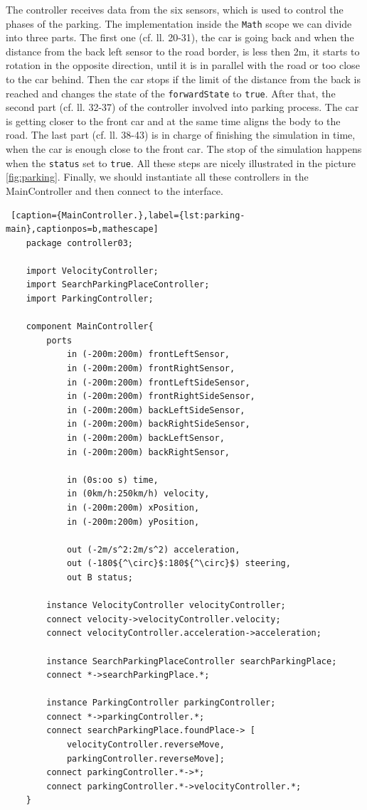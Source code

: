 \bigskip
The controller receives data from the six sensors, which is used to control the phases of the parking. The implementation inside the \texttt{Math} scope we can divide into three parts. The first one (cf. ll. 20-31), the car is going back and when the distance from the back left sensor to the road border, is less then 2m, it starts  to rotation in the opposite direction, until it is in parallel with the road or too close to the car behind. Then the car stops if the limit of the distance from the back is reached and changes the state of the \texttt{forwardState} to \texttt{true}. After that, the second part (cf. ll. 32-37) of the controller involved into parking process. The car is getting closer to the front car and at the same time aligns the body to the road. The last part (cf. ll. 38-43) is in charge of finishing the simulation in time, when the car is enough close to the front car. The stop of the simulation happens when the \texttt{status} set to \texttt{true}. All these steps are nicely illustrated in the picture \ref{fig:parking}. 
Finally, we should instantiate all these controllers in the MainController and then connect to the interface.
\bigskip
\begin{lstlisting} [caption={MainController.},label={lst:parking-main},captionpos=b,mathescape]
    package controller03;

    import VelocityController;
    import SearchParkingPlaceController;
    import ParkingController;
    
    component MainController{
        ports 
            in (-200m:200m) frontLeftSensor,
            in (-200m:200m) frontRightSensor,
            in (-200m:200m) frontLeftSideSensor,
            in (-200m:200m) frontRightSideSensor,
            in (-200m:200m) backLeftSideSensor,
            in (-200m:200m) backRightSideSensor,
            in (-200m:200m) backLeftSensor,
            in (-200m:200m) backRightSensor,
    
            in (0s:oo s) time,
            in (0km/h:250km/h) velocity,
            in (-200m:200m) xPosition,
            in (-200m:200m) yPosition,
    
            out (-2m/s^2:2m/s^2) acceleration,
            out (-180${^\circ}$:180${^\circ}$) steering,
            out B status;
    
        instance VelocityController velocityController;
        connect velocity->velocityController.velocity;
        connect velocityController.acceleration->acceleration;
    
        instance SearchParkingPlaceController searchParkingPlace;
        connect *->searchParkingPlace.*;
        
        instance ParkingController parkingController;
        connect *->parkingController.*;
        connect searchParkingPlace.foundPlace-> [
            velocityController.reverseMove,
            parkingController.reverseMove];
        connect parkingController.*->*;
        connect parkingController.*->velocityController.*;
    }
\end{lstlisting}
